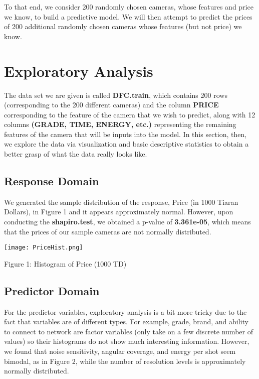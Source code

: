 \documentclass[12pt]{article}
\begin{document}
\noindent To that end, we consider 200 randomly chosen cameras, whose features and price we know, to build a predictive model. We will then attempt to predict the prices of 200 additional randomly chosen cameras whose features (but not price) we know. 

\section{Exploratory Analysis}
The data set we are given is called {\bf DFC.train}, which contains 200 rows (corresponding to the 200 different cameras) and the column {\bf PRICE} corresponding to the feature of the camera that we wish to predict, along with 12 columns {\bf (GRADE, TIME, ENERGY, etc.)} representing the remaining features of the camera that will be inputs into the model. In this section, then, we explore the data via visualization and basic descriptive statistics to obtain a better grasp of what the data really looks like.

\pagebreak

\subsection{Response Domain}
We generated the sample distribution of the response, Price (in 1000 Tiaran Dollars), in Figure 1 and it appears approximately normal. However, upon conducting the {\bf shapiro.test}, we obtained a p-value of {\bf 3.361e-05}, which means that the prices of our sample cameras are not normally distributed.\\

{\centering
\texttt{[image: PriceHist.png]}\par\smallskip}

{\centering
Figure 1: Histogram of Price (1000 TD)\par\bigskip}

\subsection{Predictor Domain}
For the predictor variables, exploratory analysis is a bit more tricky due to the fact that variables are of different types. For example, grade, brand, and ability to connect to network are factor variables (only take on a few discrete number of values) so their histograms do not show much interesting information. However, we found that noise sensitivity, angular coverage, and energy per shot seem bimodal, as in Figure 2, while the number of resolution levels is approximately normally distributed. \\
\end{document}
